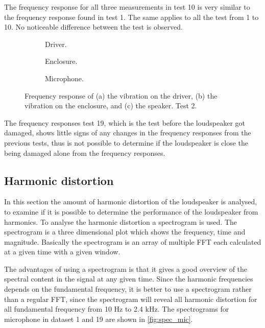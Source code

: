 The frequency response for all three measurements in test 10 is very similar to the frequency response found in test 1. The same applies to all the test from 1 to 10. No noticeable difference between the test is observed.

\begin{figure}[H]
\centering
\begin{subfigure}[t]{0.37\textwidth}
	
	\caption{Driver.}
	\label{fig:FFT_driver10}
\end{subfigure}
\begin{subfigure}[t]{0.28\textwidth}
	
	\caption{Enclosure.}
	\label{fig:FFT_enclosure19}
\end{subfigure}
\begin{subfigure}[t]{0.32\textwidth}
	
	\caption{Microphone.}
	\label{fig:FFT_mic19}
\end{subfigure}
\caption{Frequency response of (a) the vibration on the driver, (b) the vibration on the enclosure, and (c) the speaker. Test 2.}
\label{fig:FFT1}
\end{figure} 

The frequency responses test 19, which is the test before the loudspeaker got damaged, shows little signs of any changes in the frequency responses from the previous tests, thus is not possible to determine if the loudspeaker is close the being damaged alone from the frequency responses.


\subsection{Harmonic distortion}

In this section the amount of harmonic distortion of the loudspeaker is analysed, to examine if it is possible to determine the performance of the loudspeaker from harmonics. To analyse the harmonic distortion a spectrogram is used. The spectrogram is a three dimensional plot which shows the frequency, time and magnitude. Basically the spectrogram is an array of multiple FFT each calculated at a given time with a given window.

The advantages of using a spectrogram is that it gives a good overview of the spectral content in the signal at any given time. Since the harmonic frequencies depends on the fundamental frequency, it is better to use a spectrogram rather than a regular FFT, since the spectrogram will reveal all harmonic distortion for all fundamental frequency from 10 Hz to 2.4 kHz. The spectrograms for microphone in dataset 1 and 19 are shown in \autoref{fig:spec_mic}.

